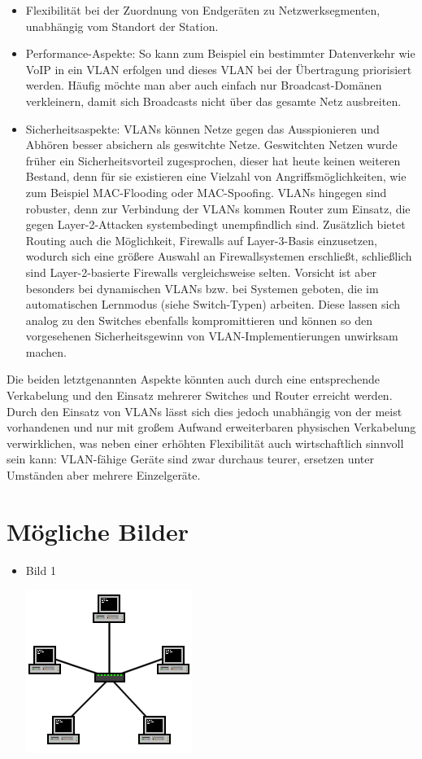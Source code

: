 \begin{itemize}
\item Flexibilität bei der Zuordnung von Endgeräten zu Netzwerksegmenten, unabhängig vom Standort der Station.
\item Performance-Aspekte: So kann zum Beispiel ein bestimmter Datenverkehr wie VoIP in ein VLAN erfolgen und dieses VLAN bei der Übertragung priorisiert werden. Häufig möchte man aber auch einfach nur Broadcast-Domänen verkleinern, damit sich Broadcasts nicht über das gesamte Netz ausbreiten.
\item Sicherheitsaspekte: VLANs können Netze gegen das Ausspionieren und Abhören besser absichern als geswitchte Netze. Geswitchten Netzen wurde früher ein Sicherheitsvorteil zugesprochen, dieser hat heute keinen weiteren Bestand, denn für sie existieren eine Vielzahl von Angriffsmöglichkeiten, wie zum Beispiel MAC-Flooding oder MAC-Spoofing. VLANs hingegen sind robuster, denn zur Verbindung der VLANs kommen Router zum Einsatz, die gegen Layer-2-Attacken systembedingt unempfindlich sind. Zusätzlich bietet Routing auch die Möglichkeit, Firewalls auf Layer-3-Basis einzusetzen, wodurch sich eine größere Auswahl an Firewallsystemen erschließt, schließlich sind Layer-2-basierte Firewalls vergleichsweise selten. Vorsicht ist aber besonders bei dynamischen VLANs bzw. bei Systemen geboten, die im automatischen Lernmodus (siehe Switch-Typen) arbeiten. Diese lassen sich analog zu den Switches ebenfalls kompromittieren und können so den vorgesehenen Sicherheitsgewinn von VLAN-Implementierungen unwirksam machen.
\end{itemize}
Die beiden letztgenannten Aspekte könnten auch durch eine entsprechende Verkabelung und den Einsatz mehrerer Switches und Router erreicht werden. Durch den Einsatz von VLANs lässt sich dies jedoch unabhängig von der meist vorhandenen und nur mit großem Aufwand erweiterbaren physischen Verkabelung verwirklichen, was neben einer erhöhten Flexibilität auch wirtschaftlich sinnvoll sein kann: VLAN-fähige Geräte sind zwar durchaus teurer, ersetzen unter Umständen aber mehrere Einzelgeräte.

\section{Mögliche Bilder}
\begin{itemize}
\item Bild 1 \\
\begin{center}
 \includegraphics[scale=1]{files/img/lyaton_switch.png}
\end{center}
\end{itemize}
